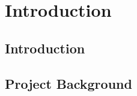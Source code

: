 \chapter{Introduction}\label{ch:intro}


\section{Introduction}\label{sec:introch1}

\section{Project Background}
